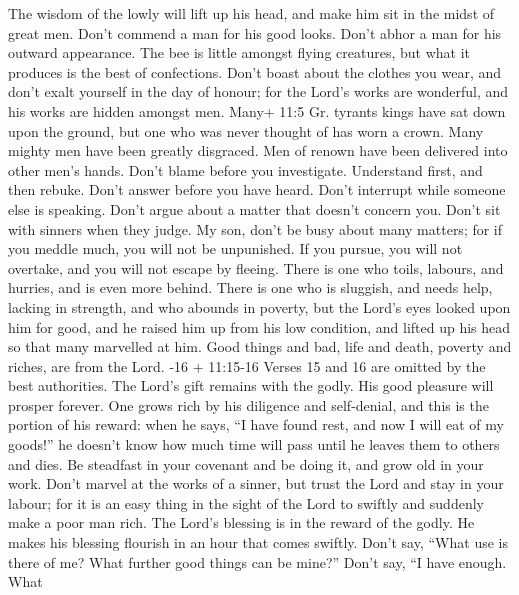  The wisdom of the lowly will lift up his head, and make him
sit in the midst of great men.  Don't commend a man for his
good looks. Don't abhor a man for his outward appearance. 
The bee is little amongst flying creatures, but what it produces is the
best of confections.  Don't boast about the clothes you
wear, and don't exalt yourself in the day of honour; for the Lord's
works are wonderful, and his works are hidden amongst men. 
Many+ 11:5 Gr. tyrants kings have sat down upon the ground, but one who
was never thought of has worn a crown.  Many mighty men have
been greatly disgraced. Men of renown have been delivered into other
men's hands.  Don't blame before you investigate. Understand
first, and then rebuke.  Don't answer before you have heard.
Don't interrupt while someone else is speaking.  Don't argue
about a matter that doesn't concern you. Don't sit with sinners when
they judge.  My son, don't be busy about many matters; for
if you meddle much, you will not be unpunished. If you pursue, you will
not overtake, and you will not escape by fleeing.  There is
one who toils, labours, and hurries, and is even more behind.
 There is one who is sluggish, and needs help, lacking in
strength, and who abounds in poverty, but the Lord's eyes looked upon
him for good, and he raised him up from his low condition, 
and lifted up his head so that many marvelled at him.  Good
things and bad, life and death, poverty and riches, are from the Lord.
-16 + 11:15-16 Verses 15 and 16 are omitted by the best
authorities.  The Lord's gift remains with the godly. His
good pleasure will prosper forever.  One grows rich by his
diligence and self-denial, and this is the portion of his reward:
 when he says, ``I have found rest, and now I will eat of
my goods!'' he doesn't know how much time will pass until he leaves them
to others and dies.  Be steadfast in your covenant and be
doing it, and grow old in your work.  Don't marvel at the
works of a sinner, but trust the Lord and stay in your labour; for it is
an easy thing in the sight of the Lord to swiftly and suddenly make a
poor man rich.  The Lord's blessing is in the reward of the
godly. He makes his blessing flourish in an hour that comes swiftly.
 Don't say, ``What use is there of me? What further good
things can be mine?''  Don't say, ``I have enough. What
